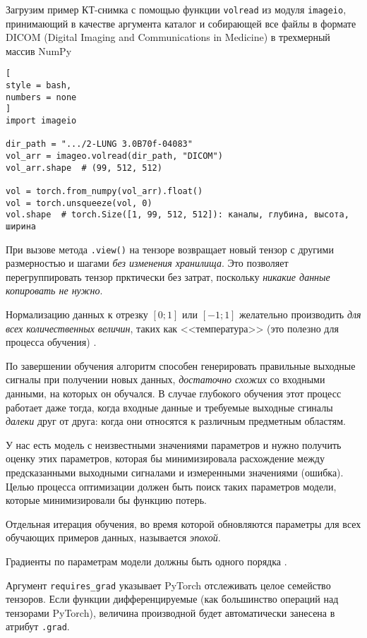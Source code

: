 \documentclass[%
	11pt,
	a4paper,
	utf8,
		]{article}
\begin{document}
Загрузим пример КТ-снимка с помощью функции \verb|volread| из модуля \verb|imageio|, принимающий в качестве аргумента каталог и собирающей все файлы в формате DICOM (Digital Imaging and Communications in Medicine) в трехмерный массив NumPy
\begin{lstlisting}[
style = bash,
numbers = none
]
import imageio

dir_path = ".../2-LUNG 3.0B70f-04083"
vol_arr = imageo.volread(dir_path, "DICOM")
vol_arr.shape  # (99, 512, 512)

vol = torch.from_numpy(vol_arr).float()
vol = torch.unsqueeze(vol, 0)
vol.shape  # torch.Size([1, 99, 512, 512]): каналы, глубина, высота, ширина
\end{lstlisting}

При вызове метода \verb|.view()| на тензоре возвращает новый тензор с другими размерностью и шагами \emph{без изменения хранилища}. Это позволяет перегруппировать тензор прктически без затрат, поскольку \emph{никакие данные копировать не нужно}.

Нормализацию данных к отрезку $[0; 1]$ или $[-1; 1]$ желательно производить \emph{для всех количественных величин}, таких как <<температура>> (это полезно для процесса обучения) \cite[]{pytorch-2022}.

По завершении обучения алгоритм способен генерировать правильные выходные сигналы при получении новых данных, \emph{достаточно схожих} со входными данными, на которых он обучался. В случае глубокого обучения этот процесс работает даже тогда, когда входные данные и требуемые выходные сгиналы \emph{далеки} друг от друга: когда они относятся к различным предметным областям.

У нас есть модель с неизвестными значениями параметров и нужно получить оценку этих параметров, которая бы минимизировала расхождение между предсказанными выходными сигналами и измеренными значениями (ошибка). Целью процесса оптимизации должен быть поиск таких параметров модели, которые минимизировали бы функцию потерь.

Отдельная итерация обучения, во время которой обновляются параметры для всех обучающих примеров данных, называется \emph{эпохой}.

Градиенты по параметрам модели должны быть одного порядка \cite[]{pytorch-2022}.

Аргумент \verb|requires_grad| указывает PyTorch отслеживать целое семейство тензоров. Если функции дифференцируемые (как большинство операций над тензорами PyTorch), величина производной будет автоматически занесена в атрибут \verb|.grad|.
\end{document}
